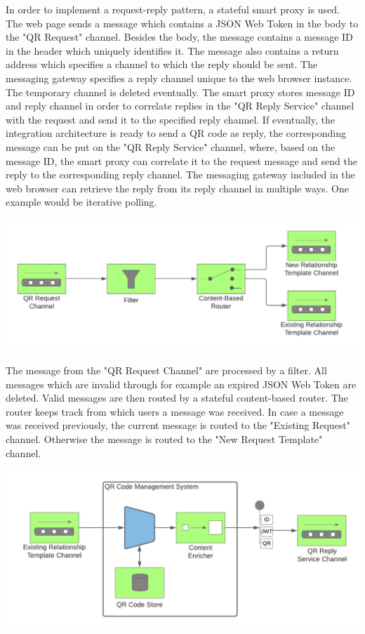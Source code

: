 \documentclass[
     12pt,         %
     a4paper,      %
     BCOR=10mm,version=first,     %
     DIV=14,version=first,        %
     ]{scrreprt}
\begin{document}
In order to implement a request-reply pattern, a stateful smart proxy is used. The web page sends a message which contains a JSON Web Token in the body to the "QR Request" channel. Besides the body, the message contains a message ID in the header which uniquely identifies it. The message also contains a return address which specifies a channel to which the reply should be sent. The messaging gateway specifies a reply channel unique to the web browser instance. The temporary channel is deleted eventually. The smart proxy stores message ID and reply channel in order to correlate replies in the "QR Reply Service" channel with the request and send it to the specified reply channel. If eventually, the integration architecture is ready to send a QR code as reply, the corresponding message can be put on the "QR Reply Service" channel, where, based on the message ID, the smart proxy can correlate it to the request message and send the reply to the corresponding reply channel. The messaging gateway included in the web browser can retrieve the reply from its reply channel in multiple ways. One example would be iterative polling.

\begin{center}
    \includegraphics[width=15cm]{Diagrams/Integration 1/Connection/Messaging 3.png}
\end{center}

The message from the "QR Request Channel" are processed by a filter. All messages which are invalid through for example an expired JSON Web Token are deleted. Valid messages are then routed by a stateful content-based router. The router keeps track from which users a message was received. In case a message was received previously, the current message is routed to the "Existing Request" channel. Otherwise the message is routed to the "New Request Template" channel.

\begin{center}
    \includegraphics[width=15cm]{Diagrams/Integration 1/Connection/Messaging 4.png}
\end{center}
\end{document}
